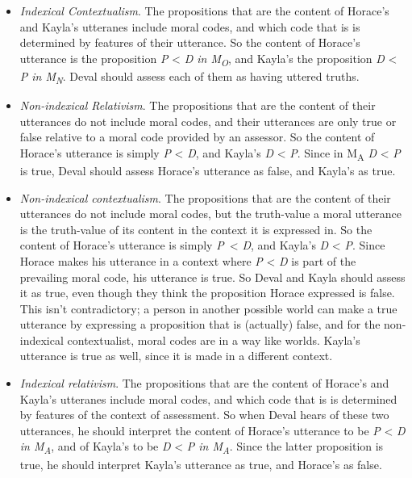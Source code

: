 \begin{itemize}
\item \textit{Indexical Contextualism}. The propositions that are the content of Horace's and Kayla's utteranes include moral codes, and which code that is is determined by features of their utterance. So the content of Horace's utterance is the proposition \textit{P }{\textless}\textit{ D in M}\textit{\textsubscript{O}}, and Kayla's the proposition \textit{D }{\textless}\textit{ P in M}\textit{\textsubscript{N}}. Deval should assess each of them as having uttered truths.
\item \textit{Non-indexical Relativism}. The propositions that are the content of their utterances do not include moral codes, and their utterances are only true or false relative to a moral code provided by an assessor. So the content of Horace's utterance is simply \textit{P }{\textless}\textit{ D}, and Kayla's \textit{D }{\textless}\textit{ P}. Since in M\textsubscript{A} \textit{D }{\textless}\textit{ P} is true, Deval should assess Horace's utterance as false, and Kayla's as true.
\item \textit{Non-indexical contextualism}. The propositions that are the content of their utterances do not include moral codes, but the truth-value a moral utterance is the truth-value of its content in the context it is expressed in. So the content of Horace's utterance is simply \textit{P~}{\textless}\textit{ D}, and Kayla's \textit{D }{\textless}\textit{ P}. Since Horace makes his utterance in a context where \textit{P} {\textless} \textit{D} is part of the prevailing moral code, his utterance is true. So Deval and Kayla should assess it as true, even though they think the proposition Horace expressed is false. This isn't contradictory; a person in another possible world can make a true utterance by expressing a proposition that is (actually) false, and for the non-indexical contextualist, moral codes are in a way like worlds. Kayla's utterance is true as well, since it is made in a different context.
\item \textit{Indexical relativism}. The propositions that are the content of Horace's and Kayla's utteranes include moral codes, and which code that is is determined by features of the context of assessment. So when Deval hears of these two utterances, he should interpret the content of Horace's utterance to be \textit{P }{\textless}\textit{ D in M}\textit{\textsubscript{A}}, and of Kayla's to be \textit{D }{\textless}\textit{ P in M}\textit{\textsubscript{A}}. Since the latter proposition is true, he should interpret Kayla's utterance as true, and Horace's as false.
\end{itemize}

